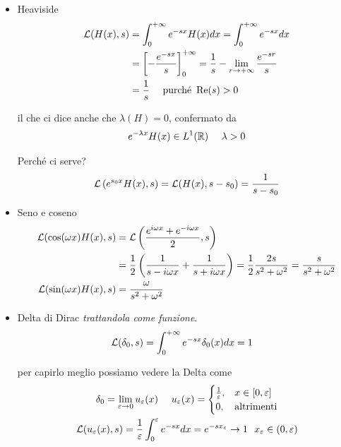 \begin{itemize}
\item Heaviside
\begin{align*}
\mathcal{L}(H(x), s) & = \int^{+ \infty}_{0} e^{- sx} H(x) dx = \int^{+ \infty}_{0} e^{- sx} dx\\
 & = \left[ - \frac{e^{- sx}}{s}\right]^{+ \infty}_{0} = \frac{1}{s} - \lim_{r\rightarrow + \infty}\frac{e^{- sr}}{s}\\
 & = \frac{1}{s} \ \ \ \ \text{purché} \ \operatorname{Re} (s) > 0
\end{align*}

il che ci dice anche che $\lambda (H) = 0$, confermato da
\begin{equation*}
e^{- \lambda x} H(x) \in L^{1}(\mathbb{R}) \ \ \ \ \lambda > 0
\end{equation*}

Perché ci serve?
\begin{equation*}
\mathcal{L}\left(e^{s_{0} x} H(x), s\right) = \mathcal{L}(H(x), s - s_{0}) = \frac{1}{s - s_{0}}
\end{equation*}
\item Seno e coseno
\begin{align*}
\mathcal{L}(\cos(\omega x) H(x), s) & = \mathcal{L}\left(\frac{e^{i\omega x} + e^{- i\omega x}}{2}, s\right)\\
 & = \frac{1}{2}\left(\frac{1}{s - i\omega x} + \frac{1}{s + i\omega x}\right) = \frac{1}{2}\frac{2s}{s^{2} + \omega^{2}} = \frac{s}{s^{2} + \omega^{2}}\\
\mathcal{L}(\sin(\omega x) H(x), s) & = \frac{\omega}{s^{2} + \omega^{2}}
\end{align*}
\item Delta di Dirac \textit{trattandola come funzione}.
\begin{align*}
\mathcal{L}(\delta_{0}, s) & = \int^{+ \infty}_{0} e^{- sx} \delta_{0}(x) dx = 1
\end{align*}

per capirlo meglio possiamo vedere la Delta come
\begin{gather*}
\delta_{0} = \lim\limits_{\varepsilon \rightarrow 0} u_{\varepsilon}(x) \ \ \ \ u_{\varepsilon}(x) =
\begin{cases}
\frac{1}{\varepsilon}, & x\in [0, \varepsilon]\\
0, & \text{altrimenti}
\end{cases}\\
\mathcal{L}(u_{\varepsilon}(x), s) = \frac{1}{\varepsilon}\int^{\varepsilon}_{0} e^{- sx} dx = e^{- sx_{\varepsilon}}\rightarrow 1\ \ x_{\varepsilon} \in (0, \varepsilon)
\end{gather*}
\end{itemize}
